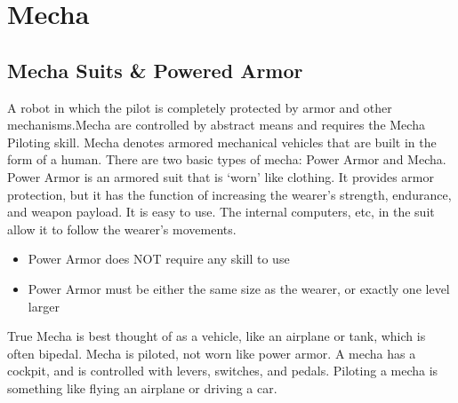 \documentclass[twoside]{book}
\begin{document}
\vspace{1ex}
    
    

\chapter{Mecha}
    
    

\section{Mecha Suits \& Powered Armor}
      A robot in which the pilot is completely protected by
             armor and other mechanisms.Mecha are controlled by abstract
             means and requires the Mecha Piloting skill.   Mecha denotes armored mechanical vehicles that are
             built in the form of a human. There are two basic types of
             mecha: Power Armor and Mecha.   Power Armor is an armored suit that is
             `worn' like clothing. It provides armor
             protection, but it has the function of increasing the
             wearer's strength, endurance, and weapon payload. It
             is easy to use. The internal computers, etc, in the suit
             allow it to follow the wearer's movements. 
\begin{itemize}
      
  \item  Power Armor does NOT require any skill to use
               
  \item  Power Armor must be either the same size as the
               wearer, or exactly one level larger 
\end{itemize}
    True Mecha is best thought of as a vehicle, like an
             airplane or tank, which is often bipedal. Mecha is piloted,
             not worn like power armor. A mecha has a cockpit, and is
             controlled with levers, switches, and pedals. Piloting a
             mecha is something like flying an airplane or driving a car.
             
\end{document}
